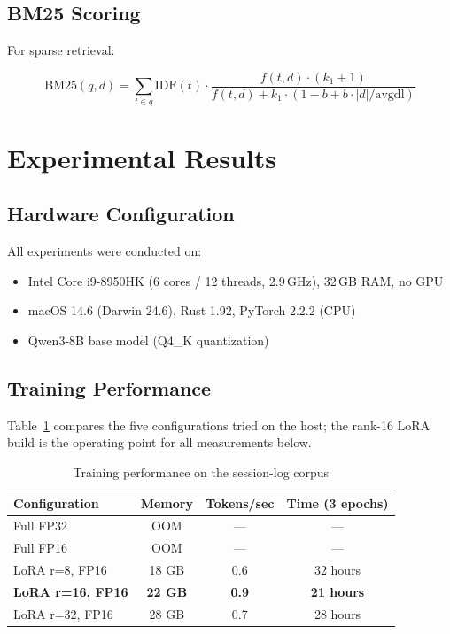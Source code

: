 \documentclass[11pt,a4paper]{article}
\theoremstyle{plain}
\theoremstyle{definition}
\begin{document}
\subsection{BM25 Scoring}

For sparse retrieval:

\begin{equation}
    \text{BM25}(q, d) = \sum_{t \in q} \text{IDF}(t) \cdot \frac{f(t,d) \cdot (k_1 + 1)}{f(t,d) + k_1 \cdot (1 - b + b \cdot |d|/\text{avgdl})}
    \label{eq:bm25}
\end{equation}

\section{Experimental Results}
\label{sec:experiments}

\subsection{Hardware Configuration}

All experiments were conducted on:
\begin{itemize}
    \item Intel Core i9-8950HK (6 cores / 12 threads, 2.9\,GHz), 32\,GB RAM, no GPU
    \item macOS 14.6 (Darwin 24.6), Rust 1.92, PyTorch 2.2.2 (CPU)
    \item Qwen3-8B base model (Q4\_K quantization)
\end{itemize}

\subsection{Training Performance}

Table~\ref{tab:training} compares the five configurations tried on the host;
the rank-16 LoRA build is the operating point for all measurements below.

\begin{table}[h]
\centering
\caption{Training performance on the session-log corpus}
\begin{tabular}{lccc}
\toprule
\textbf{Configuration} & \textbf{Memory} & \textbf{Tokens/sec} & \textbf{Time (3 epochs)} \\
\midrule
Full FP32 & OOM & --- & --- \\
Full FP16 & OOM & --- & --- \\
LoRA r=8, FP16 & 18 GB & 0.6 & 32 hours \\
\textbf{LoRA r=16, FP16} & \textbf{22 GB} & \textbf{0.9} & \textbf{21 hours} \\
LoRA r=32, FP16 & 28 GB & 0.7 & 28 hours \\
\bottomrule
\end{tabular}
\label{tab:training}
\end{table}
\end{document}

